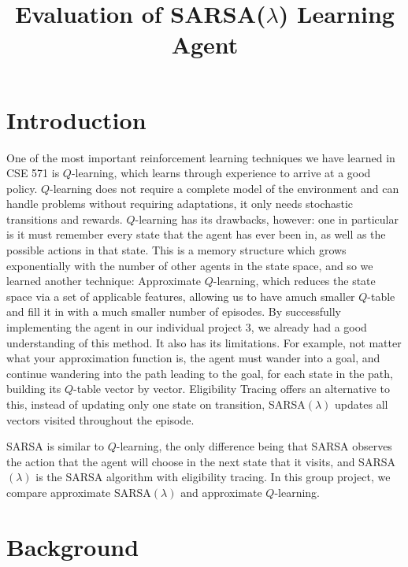 \documentclass[10pt,conference]{IEEEtran}
\title{
	Evaluation of SARSA(\(\lambda\)) Learning Agent 
	}
\author{
	\IEEEauthorblockN{Padraic Cashin \IEEEauthorrefmark{1}, 
	        Ruihao Zhou \IEEEauthorrefmark{2}
		David Lahtinen \IEEEauthorrefmark{3}, 
		Zubin Kapadia \IEEEauthorrefmark{4},
	}
	\IEEEauthorblockA{
		\IEEEauthorrefmark{1} ASU ID: 1214153888 \\
		\IEEEauthorrefmark{2} ASU ID: 1213439264 \\
		\IEEEauthorrefmark{3} ASU ID: 1207725034 \\
		\IEEEauthorrefmark{4} ASU ID: 1213238024 \\
	}
}
\begin{document}
\maketitle

\section{Introduction}

One of the most important reinforcement learning techniques we have learned in CSE 571 is 
\(Q\)-learning, which learns through experience to arrive at a good policy.
\(Q\)-learning does not require a complete model of the environment and 
can handle problems without requiring adaptations, it only needs stochastic 
transitions and rewards. \(Q\)-learning has its drawbacks, however: one in particular is
it must remember every state that the agent has ever been in, as well as the possible actions in that
state. This is a memory structure which grows exponentially with the number of other agents in the state space,
and so we learned another technique: Approximate \(Q\)-learning, 
which reduces the state space via a set of applicable features,
allowing us to have amuch smaller \(Q\)-table and fill it in with a much smaller number of episodes.
By successfully implementing the agent in our individual project 
3, we already had a good understanding of this method. It also has its limitations.
For example, not matter what your approximation function is, the agent must wander into a goal, and continue wandering
into the path leading to the goal, for each state in the path, building its \(Q\)-table vector by vector.
Eligibility Tracing offers an alternative to this, instead of updating only one state on transition,
SARSA\((\lambda)\) updates all vectors visited throughout the episode.

SARSA is similar to \(Q\)-learning, the only difference being that SARSA observes the action that the agent will choose
in the next state that it visits, and SARSA\((\lambda)\) is the SARSA algorithm with eligibility tracing.
In this group project, we compare approximate SARSA\((\lambda)\) and approximate \(Q\)-learning.

\label{sec:intro}

\section{Background}
\label{sec:background}
	
\end{document}

